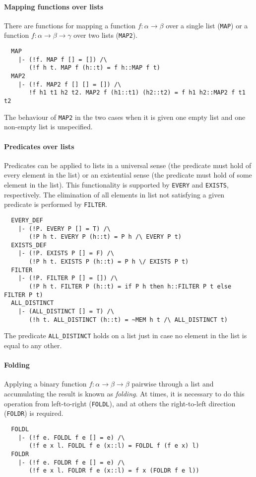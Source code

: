 \paragraph {Mapping functions over lists}

There are functions for mapping a function $f : \alpha \to \beta$ over
a single list ({\small\verb+MAP+}) or a function $f : \alpha \to \beta \to \gamma$
over two lists ({\small\verb+MAP2+}).
%
{\small
\begin{verbatim}
  MAP
    |- (!f. MAP f [] = []) /\
       (!f h t. MAP f (h::t) = f h::MAP f t)
  MAP2
    |- (!f. MAP2 f [] [] = []) /\
       !f h1 t1 h2 t2. MAP2 f (h1::t1) (h2::t2) = f h1 h2::MAP2 f t1 t2
\end{verbatim}}
%
The behaviour of {\small\verb+MAP2+} in the two cases when it is given
one empty list and one non-empty list is unspecified.

\paragraph {Predicates over lists}

Predicates can be applied to lists in a universal sense (the predicate
must hold of every element in the list) or an existential sense (the
predicate must hold of some element in the list). This functionality
is supported by {\small\verb+EVERY+} and {\small\verb+EXISTS+},
respectively. The elimination of all elements in list not satisfying
a given predicate is performed by {\small\verb+FILTER+}.
%
{\small
\begin{verbatim}
  EVERY_DEF
    |- (!P. EVERY P [] = T) /\
       (!P h t. EVERY P (h::t) = P h /\ EVERY P t)
  EXISTS_DEF
    |- (!P. EXISTS P [] = F) /\
       (!P h t. EXISTS P (h::t) = P h \/ EXISTS P t)
  FILTER
    |- (!P. FILTER P [] = []) /\
       (!P h t. FILTER P (h::t) = if P h then h::FILTER P t else FILTER P t)
  ALL_DISTINCT
    |- (ALL_DISTINCT [] = T) /\
       (!h t. ALL_DISTINCT (h::t) = ~MEM h t /\ ALL_DISTINCT t)
\end{verbatim}}
%
The predicate {\small\verb+ALL_DISTINCT+} holds on a list  just
in case no element in the list is equal to any other.

\paragraph {Folding}

Applying a binary function $f : \alpha\to\beta\to\beta$ pairwise
through a list and accumulating the result is known as
\emph{folding}. At times, it is necessary to do this operation
from left-to-right ({\small\verb+FOLDL+}), and at others the
right-to-left direction ({\small\verb+FOLDR+}) is required.
%
{\small
\begin{verbatim}
  FOLDL
    |- (!f e. FOLDL f e [] = e) /\
       (!f e x l. FOLDL f e (x::l) = FOLDL f (f e x) l)
  FOLDR
    |- (!f e. FOLDR f e [] = e) /\
       (!f e x l. FOLDR f e (x::l) = f x (FOLDR f e l))
\end{verbatim}}

